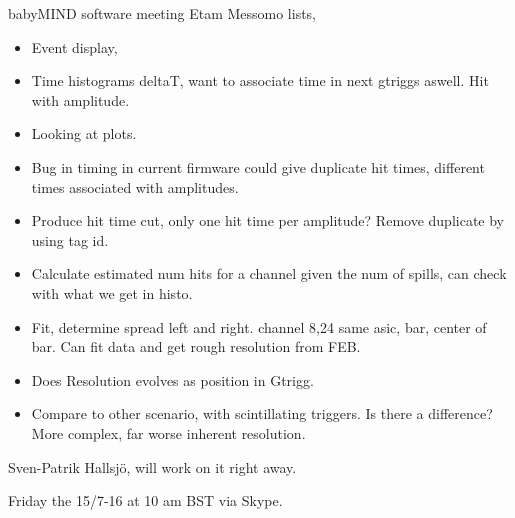 \documentclass{article}
\begin{document}
\begin{Minutes}{babyMIND software meeting}
Etam Messomo lists,
\begin{itemize}
\item Event display,
\item Time histograms deltaT, want to associate time in next gtriggs aswell. Hit with amplitude.
\item Looking at plots.
\item Bug in timing in current firmware could give duplicate hit times, different times associated with amplitudes.
\item Produce hit time cut, only one hit time per amplitude? Remove duplicate by using tag id. 
\item Calculate estimated num hits for a channel given the num of spills, can check with what we get in histo.
\item Fit, determine spread left and right. channel 8,24 same asic, bar, center of bar. Can fit data and get rough resolution from FEB.
\item Does Resolution evolves as position in Gtrigg.
\item Compare to other scenario, with scintillating triggers. Is there a difference? More complex, far worse inherent resolution. 
\end{itemize}

Sven-Patrik Hallsj\"o, will work on it right away.

Friday the 15/7-16 at 10 am BST via Skype.

\end{Minutes}
\end{document}
